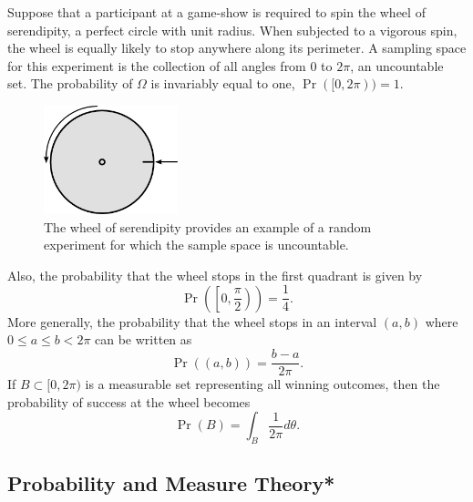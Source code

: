 \begin{example}
Suppose that a participant at a game-show is required to spin the wheel of serendipity, a perfect circle with unit radius.
When subjected to a vigorous spin, the wheel is equally likely to stop anywhere along its perimeter.
A sampling space for this experiment is the collection of all angles from $0$ to $2 \pi$, an uncountable set.
The probability of $\Omega$ is invariably equal to one, $\Pr ([0, 2 \pi)) = 1$.

\begin{figure}[tbh!]
\begin{center}
\includegraphics[height=3.15cm]{Figures/2Chapter/wheel}
\caption{The wheel of serendipity provides an example of a random experiment for which the sample space is uncountable.}
\end{center}
\end{figure}

Also, the probability that the wheel stops in the first quadrant is given by
\begin{equation*}
\Pr \left( \left[ 0, \frac{\pi}{2} \right) \right) = \frac{1}{4}.
\end{equation*}
More generally, the probability that the wheel stops in an interval $(a, b)$ where $0 \leq a \leq b < 2 \pi$ can be written as
\begin{equation*}
\Pr ((a,b)) = \frac{b - a}{2 \pi}.
\end{equation*}
If $B \subset [0, 2 \pi)$ is a measurable set representing all winning outcomes, then the probability of success at the wheel becomes
\begin{equation*}
\Pr(B) = \int_B \frac{1}{2 \pi} d\theta .
\end{equation*}
\end{example}


\subsection{Probability and Measure Theory*}


